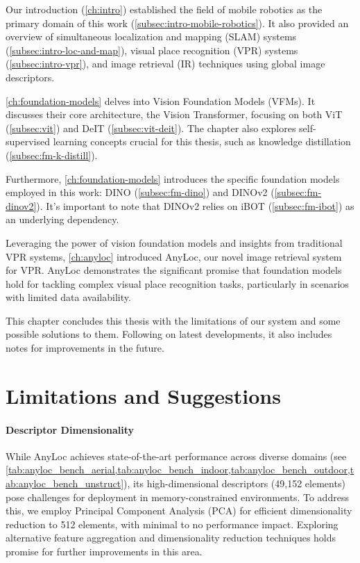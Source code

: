 
Our introduction (\cref{ch:intro}) established the field of mobile
robotics as the primary domain of this work
(\cref{subsec:intro-mobile-robotics}). It also provided an overview of
simultaneous localization and mapping (SLAM) systems
(\cref{subsec:intro-loc-and-map}), visual place recognition (VPR)
systems (\cref{subsec:intro-vpr}), and image retrieval (IR) techniques
using global image descriptors.

\cref{ch:foundation-models} delves into Vision Foundation Models
(VFMs). It discusses their core architecture, the Vision Transformer,
focusing on both ViT (\cref{subsec:vit}) and DeIT
(\cref{subsec:vit-deit}). The chapter also explores self-supervised
learning concepts crucial for this thesis, such as knowledge
distillation (\cref{subsec:fm-k-distill}).

Furthermore, \cref{ch:foundation-models} introduces the specific
foundation models employed in this work: DINO (\cref{subsec:fm-dino})
and DINOv2 (\cref{subsec:fm-dinov2}). It's important to note that
DINOv2 relies on iBOT (\cref{subsec:fm-ibot}) as an underlying
dependency.

Leveraging the power of vision foundation models and insights from
traditional VPR systems, \cref{ch:anyloc} introduced AnyLoc, our novel
image retrieval system for VPR.  AnyLoc demonstrates the significant
promise that foundation models hold for tackling complex visual place
recognition tasks, particularly in scenarios with limited data
availability.

This chapter concludes this thesis with the limitations of our system
and some possible solutions to them. Following on latest developments,
it also includes notes for improvements in the future.

\section{Limitations and Suggestions}

\paragraph{Descriptor Dimensionality}

While AnyLoc achieves state-of-the-art performance across diverse
domains (see \cref{tab:anyloc_bench_aerial,tab:anyloc_bench_indoor,tab:anyloc_bench_outdoor,tab:anyloc_bench_unstruct}),
its high-dimensional descriptors (49,152 elements) pose challenges for
deployment in memory-constrained environments. To address this, we
employ Principal Component Analysis (PCA) for efficient dimensionality
reduction to 512 elements, with minimal to no performance impact.
Exploring alternative feature aggregation and dimensionality reduction
techniques holds promise for further improvements in this area.


